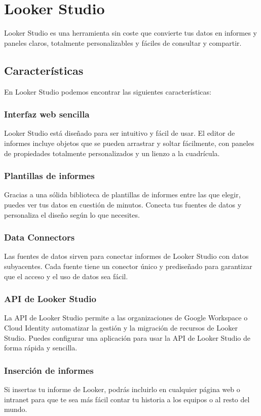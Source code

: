 \section{Looker Studio}
Looker Studio es una herramienta sin coste que convierte tus datos en informes y paneles
claros, totalmente personalizables y fáciles de consultar y compartir. \cite{looker-data-visualization}

\subsection{Características}
En Looker Studio podemos encontrar las siguientes características:

\subsubsection{Interfaz web sencilla}
Looker Studio está diseñado para ser intuitivo y fácil de usar. El editor de informes
incluye objetos que se pueden arrastrar y soltar fácilmente, con paneles de propiedades
totalmente personalizados y un lienzo a la cuadrícula.

\subsubsection{Plantillas de informes}
Gracias a una sólida biblioteca de plantillas de informes entre las que elegir, puedes
ver tus datos en cuestión de minutos. Conecta tus fuentes de datos y personaliza el
diseño según lo que necesites.

\subsubsection{Data Connectors}
Las fuentes de datos sirven para conectar informes de Looker Studio con datos subyacentes.
Cada fuente tiene un conector único y prediseñado para garantizar que el acceso y el uso
de datos sea fácil.

\subsubsection{API de Looker Studio}
La API de Looker Studio permite a las organizaciones de Google Workspace o Cloud Identity
automatizar la gestión y la migración de recursos de Looker Studio. Puedes configurar
una aplicación para usar la API de Looker Studio de forma rápida y sencilla.

\subsubsection{Inserción de informes}
Si insertas tu informe de Looker, podrás incluirlo en cualquier página web o intranet
para que te sea más fácil contar tu historia a los equipos o al resto del mundo.